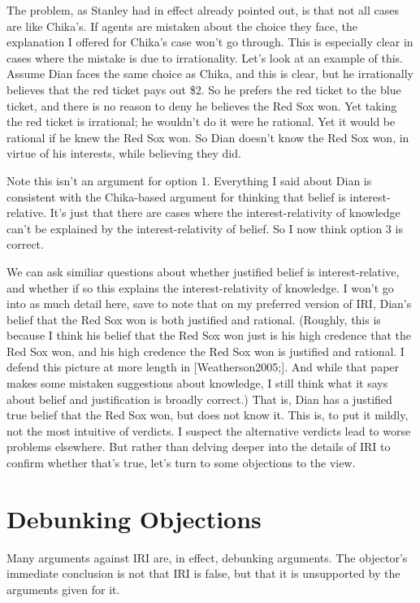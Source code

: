 \documentclass[
  10pt,
  letterpaper,
  DIV=11,
  numbers=noendperiod,
  twoside]{scrartcl}
\begin{document}
The problem, as Stanley had in effect already pointed out, is that not
all cases are like Chika's. If agents are mistaken about the choice they
face, the explanation I offered for Chika's case won't go through. This
is especially clear in cases where the mistake is due to irrationality.
Let's look at an example of this. Assume Dian faces the same choice as
Chika, and this is clear, but he irrationally believes that the red
ticket pays out \$2. So he prefers the red ticket to the blue ticket,
and there is no reason to deny he believes the Red Sox won. Yet taking
the red ticket is irrational; he wouldn't do it were he rational. Yet it
would be rational if he knew the Red Sox won. So Dian doesn't know the
Red Sox won, in virtue of his interests, while believing they did.

Note this isn't an argument for option 1. Everything I said about Dian
is consistent with the Chika-based argument for thinking that belief is
interest-relative. It's just that there are cases where the
interest-relativity of knowledge can't be explained by the
interest-relativity of belief. So I now think option 3 is correct.

We can ask similiar questions about whether justified belief is
interest-relative, and whether if so this explains the
interest-relativity of knowledge. I won't go into as much detail here,
save to note that on my preferred version of IRI, Dian's belief that the
Red Sox won is both justified and rational. (Roughly, this is because I
think his belief that the Red Sox won just is his high credence that the
Red Sox won, and his high credence the Red Sox won is justified and
rational. I defend this picture at more length in {[}Weatherson2005;{]}.
And while that paper makes some mistaken suggestions about knowledge, I
still think what it says about belief and justification is broadly
correct.) That is, Dian has a justified true belief that the Red Sox
won, but does not know it. This is, to put it mildly, not the most
intuitive of verdicts. I suspect the alternative verdicts lead to worse
problems elsewhere. But rather than delving deeper into the details of
IRI to confirm whether that's true, let's turn to some objections to the
view.

\section{Debunking Objections}\label{debunkingobjections}

Many arguments against IRI are, in effect, debunking arguments. The
objector's immediate conclusion is not that IRI is false, but that it is
unsupported by the arguments given for it.
\end{document}
